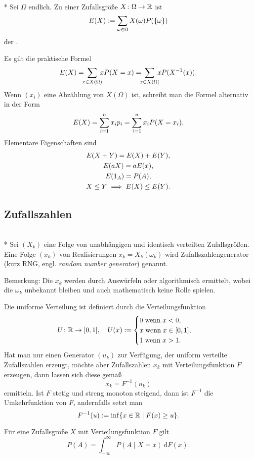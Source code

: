 \begin{definition}[Erwartungswert]\mbox{}\\*
Sei $\Omega$ endlich. Zu einer Zufallsgröße
$X\colon\Omega\to\mathbb R$ ist%
\begin{equation}
E(X) := \sum_{\omega\in\Omega} X(\omega)P(\{\omega\})
\end{equation}
der .
\end{definition}
Es gilt die praktische Formel
\begin{equation}
\E(X) = \!\!\!\sum_{x\in X(\Omega)}\!\!\! xP(X=x)
= \!\!\!\sum_{x\in X(\Omega)}\!\!\! xP(X^{-1}(x)).
\end{equation}
Wenn $(x_i)$ eine Abzählung von $X(\Omega)$ ist, schreibt man
die Formel alternativ in der Form
\begin{equation}
E(X) = \sum_{i=1}^n x_i p_i = \sum_{i=1}^n x_i P(X=x_i).
\end{equation}
Elementare Eigenschaften sind
\begin{gather}
E(X+Y) = E(X)+E(Y),\\
E(aX) = aE(x),\\
E(1_A) = P(A),\\
X\le Y \implies E(X) \le E(Y).
\end{gather}

\subsection{Zufallszahlen}

\begin{definition}[Zufallszahlengenerator]\mbox{}\\*
Sei $(X_k)$ eine Folge von unabhängigen und
identisch verteilten Zufallsgrößen. Eine Folge
$(x_k)$ von Realisierungen $x_k=X_k(\omega_k)$ wird
Zufallszahlengenerator (kurz RNG, engl. \emph{random number generator})
genannt.
\end{definition}

\noindent
Bemerkung: Die $x_k$ werden durch Auswürfeln oder algorithmisch
ermittelt, wobei die $\omega_k$ unbekannt bleiben und auch
mathematisch keine Rolle spielen.

\minisection{}
Die uniforme Verteilung ist definiert durch die Verteilungsfunktion
\begin{equation}
U\colon\mathbb R\to [0,1],\quad U(x):=\begin{cases}
0\;\text{wenn}\;x<0,\\
x\;\text{wenn}\;x\in [0,1],\\
1\;\text{wenn}\;x>1.
\end{cases}
\end{equation}
Hat man nur einen Generator $(u_k)$ zur Verfügung, der uniform
verteilte Zufallszahlen erzeugt, möchte aber Zufallszahlen $x_k$
mit Verteilungsfunktion $F$ erzeugen, dann lassen sich diese
gemäß
\begin{equation}
x_k = F^{-1}(u_k)
\end{equation}
ermitteln. Ist $F$ stetig und streng monoton steigend, dann
ist $F^{-1}$ die Umkehrfunktion von $F$, andernfalls setzt man
\begin{equation}
F^{-1}(u) := \inf\{x\in\mathbb R\mid F(x)\ge u\}.
\end{equation}

\minisection{}
Für eine Zufallsgröße $X$ mit Verteilungsfunktion $F$ gilt
\begin{equation}
P(A) = \int_{-\infty}^\infty P(A\mid X=x)\,\mathrm dF(x).
\end{equation}
